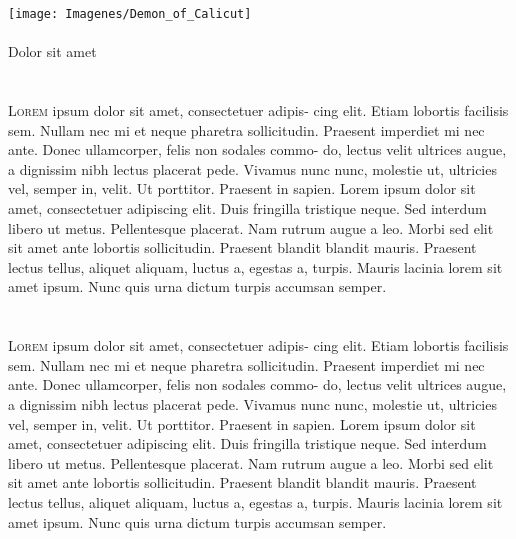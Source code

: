\documentclass[12pt,twoside]{book}
\newcommand{\traps}[5]{
		\lettrine[
			image=true,
			lines=5,
			nindent=2pt,
			depth=#1,
			lraise=#2,
			loversize=#3
			]
			{#4}{\color{black}#5}
		}
\newcommand{\mypart}[1]{%
		\clearpage
			\ifodd\value{page}
			\else
				\hbox{}\newpage
			\fi
		\thispagestyle{empty}
		\vspace*{0.01\textheight} %
		\begin{center}
			\texttt{[image: Imagenes/Demon\_of\_Calicut]}\\[2.0em]
			{\color{Sepia}\Large\Roman{part}}\\[2.0em]
			{\huge#1}
		\end{center}
		\stepcounter{part}
		}
\begin{document}
\Blindtext[4][1]

\mypart{Dolor sit amet}

\chapter{}
\traps{0}{-0.025}{0.05}{L}{orem}
ipsum dolor sit amet, consectetuer adipis- cing elit. Etiam lobortis facilisis sem. Nullam nec mi et neque pharetra sollicitudin. Praesent imperdiet mi nec ante. Donec ullamcorper, felis non sodales commo- do, lectus velit ultrices augue, a dignissim nibh lectus placerat pede. Vivamus nunc nunc, molestie ut, ultricies vel, semper in, velit. Ut porttitor. Praesent in sapien. Lorem ipsum dolor sit amet, consectetuer adipiscing elit. Duis fringilla tristique neque. Sed interdum libero ut metus. Pellentesque placerat. Nam rutrum augue a leo. Morbi sed elit sit amet ante lobortis sollicitudin. Praesent blandit blandit mauris. Praesent lectus tellus, aliquet aliquam, luctus a, egestas a, turpis. Mauris lacinia lorem sit amet ipsum. Nunc quis urna dictum turpis accumsan semper.

\Blindtext[4][1]


\chapter{}
\traps{0}{-0.025}{0.05}{L}{orem}
ipsum dolor sit amet, consectetuer adipis- cing elit. Etiam lobortis facilisis sem. Nullam nec mi et neque pharetra sollicitudin. Praesent imperdiet mi nec ante. Donec ullamcorper, felis non sodales commo- do, lectus velit ultrices augue, a dignissim nibh lectus placerat pede. Vivamus nunc nunc, molestie ut, ultricies vel, semper in, velit. Ut porttitor. Praesent in sapien. Lorem ipsum dolor sit amet, consectetuer adipiscing elit. Duis fringilla tristique neque. Sed interdum libero ut metus. Pellentesque placerat. Nam rutrum augue a leo. Morbi sed elit sit amet ante lobortis sollicitudin. Praesent blandit blandit mauris. Praesent lectus tellus, aliquet aliquam, luctus a, egestas a, turpis. Mauris lacinia lorem sit amet ipsum. Nunc quis urna dictum turpis accumsan semper.

\Blindtext[4][1]
\end{document}
